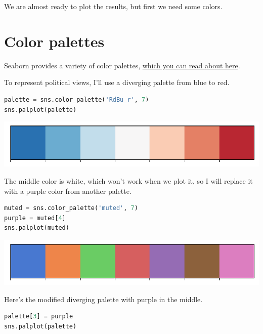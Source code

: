 We are almost ready to plot the results, but first we need some colors.

\hypertarget{color-palettes}{%
\section{Color palettes}\label{color-palettes}}

Seaborn provides a variety of color palettes,
\href{https://seaborn.pydata.org/tutorial/color_palettes.html}{which you
can read about here}.

To represent political views, I'll use a diverging palette from blue to
red.

\begin{lstlisting}[language=Python,style=source]
palette = sns.color_palette('RdBu_r', 7)
sns.palplot(palette)
\end{lstlisting}

\begin{center}
\includegraphics[scale=0.75]{02_polviews_files/02_polviews_74_0.pdf}
\end{center}

The middle color is white, which won't work when we plot it, so I will
replace it with a purple color from another palette.

\begin{lstlisting}[language=Python,style=source]
muted = sns.color_palette('muted', 7)
purple = muted[4]
sns.palplot(muted)
\end{lstlisting}

\begin{center}
\includegraphics[scale=0.75]{02_polviews_files/02_polviews_76_0.pdf}
\end{center}

Here's the modified diverging palette with purple in the middle.

\begin{lstlisting}[language=Python,style=source]
palette[3] = purple
sns.palplot(palette)
\end{lstlisting}

